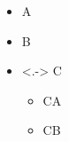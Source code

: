 \documentclass{beamer}
\begin{document}
\begin{frame}

\begin{itemize}[<+>]
\item A
\item B
\item<.-> C
\begin{itemize}
\item CA
\item CB
\end{itemize}
\end{itemize}

\end{frame}
\end{document}
